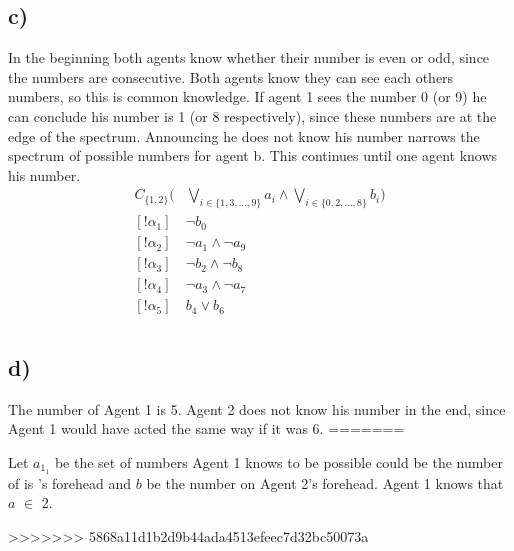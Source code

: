 \documentclass[a4paper]{article}
\begin{document}
\subsection{c)}
In the beginning both agents know whether their number is even or odd, since the numbers are consecutive. Both agents know they can see each others numbers, so this is common knowledge. If agent 1 sees the number 0 (or 9) he can conclude his number is 1 (or 8 respectively), since these numbers are at the edge of the spectrum. Announcing he does not know his number narrows the spectrum of possible numbers for agent b. This continues until one agent knows his number.
\begin{align*}
C_{\{1, 2\}}(&\bigvee_{i \in \{1, 3, ..., 9\}}a_i \land \bigvee_{i \in \{0, 2, ..., 8\}}b_i)\\
[!\alpha_1] & \lnot b_0\\
[!\alpha_2] & \lnot a_1 \land \lnot a_9\\
[!\alpha_3] & \lnot b_2 \land \lnot b_8\\
[!\alpha_4] & \lnot a_3 \land \lnot a_7\\
[!\alpha_5] & b_4 \lor b_6\\
\end{align*}

\subsection{d)}
The number of Agent 1 is 5. Agent 2 does not know his number in the end, since Agent 1 would have acted the same way if it was 6.
=======

Let $a_{1_1}$ be the set of numbers Agent 1 knows to be possible could be the number of is 's forehead and $b$ be the number on
Agent 2's forehead.
Agent 1 knows that $a$ $\in$ {2}.

>>>>>>> 5868a11d1b2d9b44ada4513efeec7d32bc50073a
\end{document}
